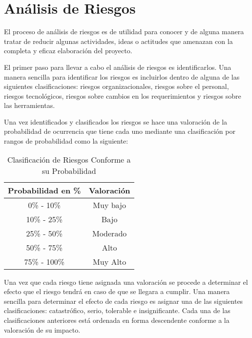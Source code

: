\section{Análisis de Riesgos}

El proceso de análisis de riesgos es de utilidad para conocer y de alguna manera tratar de reducir algunas actividades, ideas o actitudes que amenazan con la completa y eficaz elaboración del proyecto.

El primer paso para llevar a cabo el análisis de riesgos es identificarlos. Una manera sencilla para identificar los riesgos es incluirlos dentro de alguna de las siguientes clasificaciones: riesgos organizacionales, riesgos sobre el personal, riesgos tecnológicos, riesgos sobre cambios en los requerimientos y riesgos sobre las herramientas.

Una vez identificados y clasificados los riesgos se hace una valoración de la probabilidad de ocurrencia que tiene cada uno mediante una clasificación por rangos de probabilidad como la siguiente:

\begin{table}
	\begin{center}
		\begin{tabular}{|c|c|}
			\hline \rowcolor[RGB]{0,102,204} 
				\textcolor{blanco}{\bf Probabilidad en \%} &
				\textcolor{blanco}{\bf Valoración} \\
			\hline \rowcolor[RGB]{224,224,224} 
				0\% - 10\% &
				Muy bajo \\
      		\hline 
				10\% - 25\% &
				Bajo \\
			\hline \rowcolor[RGB]{224,224,224} 
				25\% - 50\% &
				Moderado \\ 
			\hline
				50\% - 75\% &
				Alto \\ 
			\hline \rowcolor[RGB]{224,224,224} 
				75\% - 100\% &
				Muy Alto \\ 
			\hline
		\end{tabular}
	\end{center}
	\caption[Clasificación de Riesgos Conforme a su Probabilidad]{Clasificación de Riesgos Conforme a su Probabilidad} 
	\label{tab:probabilidadRiesgos}
\end{table}

Una vez que cada riesgo tiene asignada una valoración se procede a determinar el efecto que el riesgo tendrá en caso de que se llegara a cumplir. Una manera sencilla para determinar el efecto de cada riesgo es asignar una de las siguientes clasificaciones: catastrófico, serio, tolerable e insignificante. Cada una de las clasificaciones anteriores está ordenada en forma descendente conforme a la valoración de su impacto.

